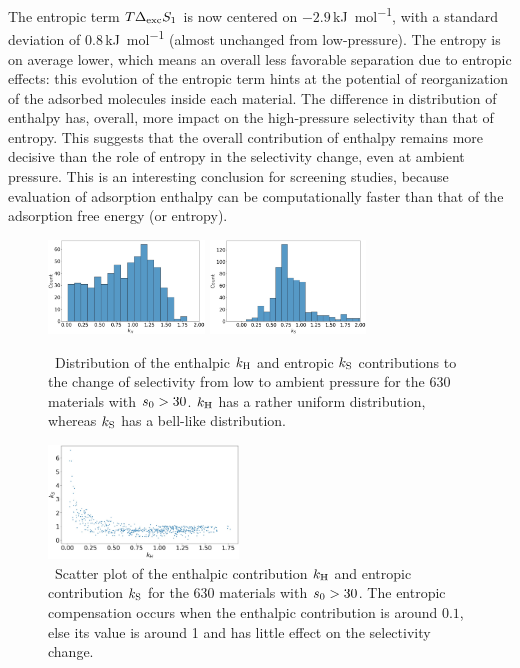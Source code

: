 \documentclass[main]{subfiles}
\begin{document}
  The entropic term $T\Delta_{\text{exc}}S_{\text{1}}$ is now centered on $-2.9$\,\si{\kilo\joule\per\mol}, with a standard deviation of $0.8$\,\si{\kilo\joule\per\mol} (almost unchanged from low-pressure). The entropy is on average lower, which means an overall less favorable separation due to entropic effects: this evolution of the entropic term hints at the potential of reorganization of the adsorbed molecules inside each material. The difference in distribution of enthalpy has, overall, more impact on the high-pressure selectivity than that of entropy. This suggests that the overall contribution of enthalpy remains more decisive than the role of entropy in the selectivity change, even at ambient pressure. This is an interesting conclusion for screening studies, because evaluation of adsorption enthalpy can be computationally faster than that of the adsorption free energy (or entropy).

\begin{figure}[t]
  \centering
    \includegraphics[width=0.37\textwidth]{figures/2-thermo/k_H.jpg}
    \hspace{8mm}
    \includegraphics[width=0.37\textwidth]{figures/2-thermo/k_S.jpg}
    \caption{\ Distribution of the enthalpic $k_{\text{H}}$ and entropic $k_{\text{S}}$ contributions to the change of selectivity from low to ambient pressure for the 630 materials with $s_{\text{0}}>30$. $k_{\text{H}}$ has a rather uniform distribution, whereas $k_{\text{S}}$ has a bell-like distribution. }
    \label{fgr:distk}
  \end{figure}
  
  \begin{figure}[t]
  \centering
    \includegraphics[width=0.45\textwidth]{figures/2-thermo/k_S_vs_k_H.jpg}
    \caption{\ Scatter plot of the enthalpic contribution $k_{\text{H}}$ and entropic contribution $k_{\text{S}}$ for the 630 materials with $s_{\text{0}}>30$. The entropic compensation occurs when the enthalpic contribution is around $0.1$, else its value is around 1 and has little effect on the selectivity change.}
    \label{fgr:scatterk}
  \end{figure}
  
\end{document}
